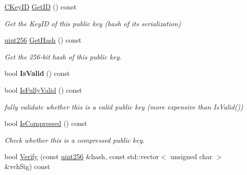 \begin{DoxyCompactItemize}
\item 
\mbox{\label{class_c_pub_key_a2675f7e6f72eff68e7a5227289feb021}} 
\mbox{\hyperlink{class_c_key_i_d}{C\+Key\+ID}} \mbox{\hyperlink{class_c_pub_key_a2675f7e6f72eff68e7a5227289feb021}{Get\+ID}} () const
\begin{DoxyCompactList}\small\item\em Get the Key\+ID of this public key (hash of its serialization) \end{DoxyCompactList}\item 
\mbox{\label{class_c_pub_key_ab1aaa3f6085a3e9bc034d3e1269d870d}} 
\mbox{\hyperlink{classuint256}{uint256}} \mbox{\hyperlink{class_c_pub_key_ab1aaa3f6085a3e9bc034d3e1269d870d}{Get\+Hash}} () const
\begin{DoxyCompactList}\small\item\em Get the 256-\/bit hash of this public key. \end{DoxyCompactList}\item 
\mbox{\label{class_c_pub_key_a4fa94293cf8577fd039b9a133f6c7f30}} 
bool {\bfseries Is\+Valid} () const
\item 
\mbox{\label{class_c_pub_key_a69d8d49962240a5696410229dd83c93e}} 
bool \mbox{\hyperlink{class_c_pub_key_a69d8d49962240a5696410229dd83c93e}{Is\+Fully\+Valid}} () const
\begin{DoxyCompactList}\small\item\em fully validate whether this is a valid public key (more expensive than Is\+Valid()) \end{DoxyCompactList}\item 
\mbox{\label{class_c_pub_key_a25f8b70340ad20ddab0f80ec4cee9396}} 
bool \mbox{\hyperlink{class_c_pub_key_a25f8b70340ad20ddab0f80ec4cee9396}{Is\+Compressed}} () const
\begin{DoxyCompactList}\small\item\em Check whether this is a compressed public key. \end{DoxyCompactList}\item 
bool \mbox{\hyperlink{class_c_pub_key_a5b3fef213b227394ca9d0a1e3baa957e}{Verify}} (const \mbox{\hyperlink{classuint256}{uint256}} \&hash, const std\+::vector$<$ unsigned char $>$ \&vch\+Sig) const
\item 

\end{DoxyCompactItemize}
